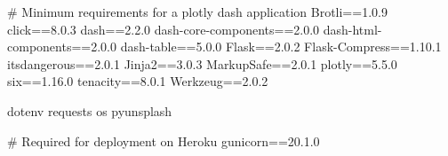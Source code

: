 # Minimum requirements for a plotly dash application
Brotli==1.0.9
click==8.0.3
dash==2.2.0
dash-core-components==2.0.0
dash-html-components==2.0.0
dash-table==5.0.0
Flask==2.0.2
Flask-Compress==1.10.1
itsdangerous==2.0.1
Jinja2==3.0.3
MarkupSafe==2.0.1
plotly==5.5.0
six==1.16.0
tenacity==8.0.1
Werkzeug==2.0.2

dotenv
requests
os
pyunsplash

# Required for deployment on Heroku
gunicorn==20.1.0